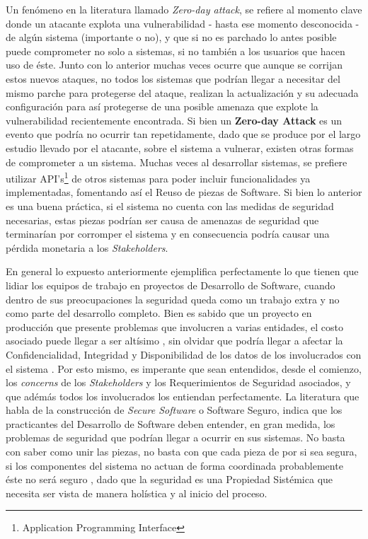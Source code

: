 Un fenómeno en la literatura llamado \textit{Zero-day attack}, se refiere al momento clave donde un atacante explota una vulnerabilidad - hasta ese momento desconocida - de algún sistema (importante o no), y que si no es parchado lo antes posible puede comprometer no solo a sistemas, si no también a los usuarios que hacen uso de éste. Junto con lo anterior muchas veces ocurre que aunque se corrijan estos nuevos ataques, no todos los sistemas que podrían llegar a necesitar del mismo parche para protegerse del ataque, realizan la actualización y su adecuada configuración para así protegerse de una posible amenaza que explote la vulnerabilidad recientemente encontrada. Si bien un \textbf{Zero-day Attack} es un evento que podría no ocurrir tan repetidamente, dado que se produce por el largo estudio llevado por el atacante, sobre el sistema a vulnerar, existen otras formas de comprometer a un sistema. Muchas veces al desarrollar sistemas, se prefiere utilizar API's\footnote{Application Programming Interface} de otros sistemas para poder incluir funcionalidades ya implementadas, fomentando así el Reuso de piezas de Software. Si bien lo anterior es una buena práctica, si el sistema no cuenta con las medidas de seguridad necesarias, estas piezas podrían ser causa de amenazas de seguridad que terminarían por corromper el sistema y en consecuencia podría causar una pérdida monetaria a los \textit{Stakeholders}. 

En general lo expuesto anteriormente ejemplifica perfectamente lo que tienen que lidiar los equipos de trabajo en proyectos de Desarrollo de Software, cuando dentro de sus preocupaciones la seguridad queda como un trabajo extra y no como parte del desarrollo completo. Bien es sabido que un proyecto en producción que presente problemas que involucren a varias entidades, el costo asociado puede llegar a ser altísimo \cite{cert}, sin olvidar que podría llegar a afectar la Confidencialidad, Integridad y Disponibilidad de los datos de los involucrados con el sistema  \cite{interCoursera}. Por esto mismo, es imperante que sean entendidos, desde el comienzo, los \textit{concerns} de los \textit{Stakeholders} y los Requerimientos de Seguridad asociados, y que adémás todos los involucrados los entiendan perfectamente. La literatura que habla de la construcción de \textit{Secure Software} o Software Seguro, indica que los practicantes del Desarrollo de Software deben entender, en gran medida, los problemas de seguridad que podrían llegar a ocurrir en sus sistemas. No basta con saber como unir las piezas, no basta con que cada pieza de por si sea segura, si los componentes del sistema no actuan de forma coordinada probablemente éste no será seguro \cite{fernandez2013security}, dado que la seguridad es una Propiedad Sistémica que necesita ser vista de manera holística y al inicio del proceso.  



